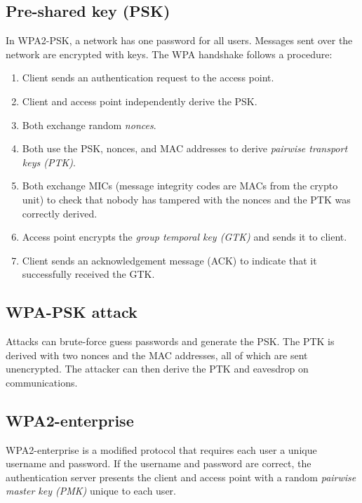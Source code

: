 \subsection{Pre-shared key (PSK)}
In WPA2-PSK, a network has one password for all users. Messages sent over the network are encrypted with keys. The WPA handshake follows a procedure:
\begin{enumerate}
    \item Client sends an authentication request to the access point.
    \item Client and access point independently derive the PSK.
    \item Both exchange random \emph{nonces}.
    \item Both use the PSK, nonces, and MAC addresses to derive \emph{pairwise transport keys (PTK)}.
    \item Both exchange MICs (message integrity codes are MACs from the crypto unit) to check that nobody has tampered with the nonces and the PTK was correctly derived.
    \item Access point encrypts the \emph{group temporal key (GTK)} and sends it to client.
    \item Client sends an acknowledgement message (ACK) to indicate that it successfully received the GTK.
\end{enumerate}

\subsection{WPA-PSK attack}
Attacks can brute-force guess passwords and generate the PSK. The PTK is derived with two nonces and the MAC addresses, all of which are sent unencrypted. The attacker can then derive the PTK and eavesdrop on communications.

\subsection{WPA2-enterprise}
WPA2-enterprise is a modified protocol that requires each user a unique username and password. If the username and password are correct, the authentication server presents the client and access point with a random \emph{pairwise master key (PMK)} unique to each user.
